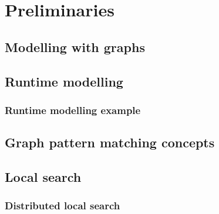 
\chapter{Preliminaries}



\section{Modelling with graphs}


\section{Runtime modelling}
\subsection{Runtime modelling example}



\section{Graph pattern matching concepts}


\section{Local search}
\subsection{Distributed local search}
